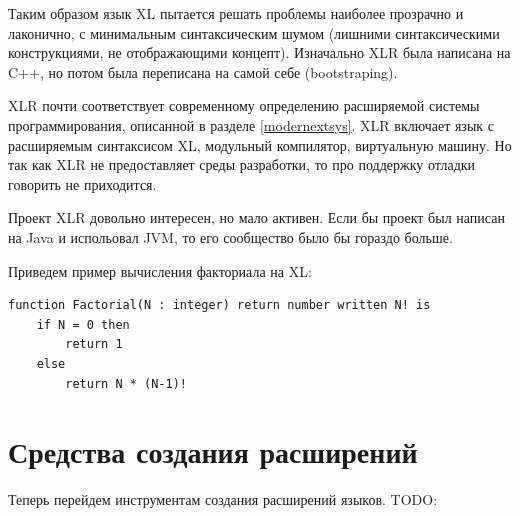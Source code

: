 \documentclass[a4paper,12pt]{article}
\begin{document}
Таким образом язык XL пытается решать проблемы наиболее прозрачно и лаконично, с
минимальным синтаксическим шумом (лишними синтаксическими конструкциями, не
отображающими концепт).
Изначально XLR была написана на C++, но потом была переписана на самой себе
(bootstraping).

XLR почти соответствует современному определению расширяемой системы
программирования, описанной в разделе \ref{modernextsys}. XLR включает язык с
расширяемым синтаксисом XL, модульный компилятор, виртуальную машину. Но так как
XLR не предоставляет среды разработки, то про поддержку отладки говорить не
приходится.

Проект XLR довольно интересен, но мало активен. Если бы проект был написан на
Java и испольовал JVM, то его сообщество было бы гораздо больше.

Приведем пример вычисления факториала на XL:
\begin{verbatim}
function Factorial(N : integer) return number written N! is
    if N = 0 then
        return 1
    else
        return N * (N-1)!
\end{verbatim}

\section{Средства создания расширений}
\label{tools}

Теперь перейдем инструментам создания расширений языков.
TODO:
\end{document}
